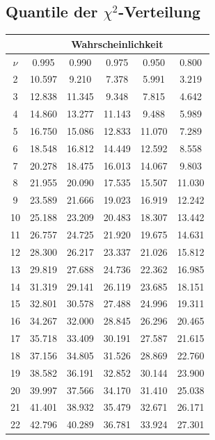 \subsection{Quantile der $\chi^2$-Verteilung}

\begin{small}
\begin{tabular}{c||c|c|c|c|c|}
 & \multicolumn{5}{c|}{Wahrscheinlichkeit}\\
\hline
$\nu$ & 0.995 & 0.990 & 0.975 & 0.950 & 0.800 \\ 
\hline\hline
2 & 10.597 & 9.210 & 7.378 & 5.991 & 3.219 \\ 
\hline
3 & 12.838 & 11.345 & 9.348 & 7.815 & 4.642 \\ 
\hline
4 & 14.860 & 13.277 & 11.143 & 9.488 & 5.989 \\ 
\hline
5 & 16.750 & 15.086 & 12.833 & 11.070 & 7.289 \\ 
\hline
6 & 18.548 & 16.812 & 14.449 & 12.592 & 8.558 \\ 
\hline
7 & 20.278 & 18.475 & 16.013 & 14.067 & 9.803 \\ 
\hline
8 & 21.955 & 20.090 & 17.535 & 15.507 & 11.030 \\ 
\hline
9 & 23.589 & 21.666 & 19.023 & 16.919 & 12.242 \\ 
\hline
10 & 25.188 & 23.209 & 20.483 & 18.307 & 13.442 \\ 
\hline
11 & 26.757 & 24.725 & 21.920 & 19.675 & 14.631 \\ 
\hline
12 & 28.300 & 26.217 & 23.337 & 21.026 & 15.812 \\ 
\hline
13 & 29.819 & 27.688 & 24.736 & 22.362 & 16.985 \\ 
\hline
14 & 31.319 & 29.141 & 26.119 & 23.685 & 18.151 \\ 
\hline
15 & 32.801 & 30.578 & 27.488 & 24.996 & 19.311 \\ 
\hline
16 & 34.267 & 32.000 & 28.845 & 26.296 & 20.465 \\ 
\hline
17 & 35.718 & 33.409 & 30.191 & 27.587 & 21.615 \\ 
\hline
18 & 37.156 & 34.805 & 31.526 & 28.869 & 22.760 \\ 
\hline
19 & 38.582 & 36.191 & 32.852 & 30.144 & 23.900 \\ 
\hline
20 & 39.997 & 37.566 & 34.170 & 31.410 & 25.038 \\ 
\hline
21 & 41.401 & 38.932 & 35.479 & 32.671 & 26.171 \\ 
\hline
22 & 42.796 & 40.289 & 36.781 & 33.924 & 27.301 \\ 

\end{tabular}
\end{small}

